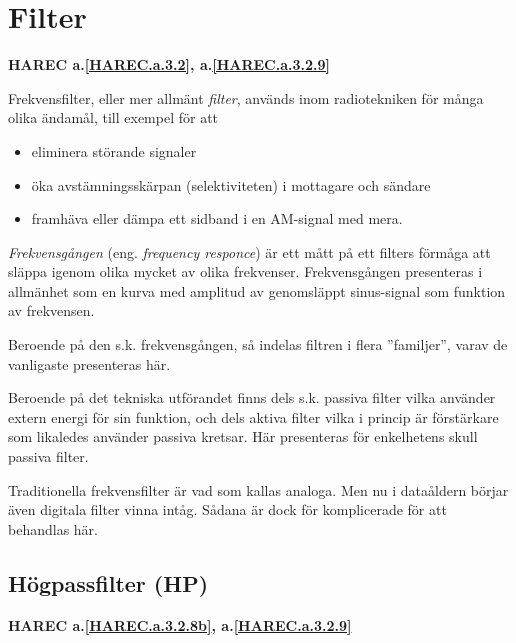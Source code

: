 \section{Filter}
\textbf{HAREC a.\ref{HAREC.a.3.2}\label{myHAREC.a.3.2}, a.\ref{HAREC.a.3.2.9}\label{myHAREC.a.3.2.9}}

Frekvensfilter, eller mer allmänt \emph{filter}, används inom radiotekniken för
många olika ändamål, till exempel för att
\begin{itemize}
  \item eliminera störande signaler
  \item öka avstämningsskärpan (selektiviteten) i mottagare och sändare
  \item framhäva eller dämpa ett sidband i en AM-signal med mera.
\end{itemize}

\emph{Frekvensgången} (eng. \emph{frequency responce}) är ett mått på ett
filters förmåga att släppa igenom olika mycket av olika frekvenser.
Frekvensgången presenteras i allmänhet som en kurva med amplitud av genomsläppt
sinus-signal som funktion av frekvensen.

Beroende på den s.k. frekvensgången, så indelas filtren i flera ''familjer'',
varav de vanligaste presenteras här.

Beroende på det tekniska utförandet finns dels s.k. passiva filter vilka
använder extern energi för sin funktion, och dels aktiva filter vilka i princip
är förstärkare som likaledes använder passiva kretsar.
Här presenteras för enkelhetens skull passiva filter.

Traditionella frekvensfilter är vad som kallas analoga.
Men nu i dataåldern börjar även digitala filter vinna intåg.
Sådana är dock för komplicerade för att behandlas här.

\subsection{Högpassfilter (HP)}
\textbf{HAREC
  a.\ref{HAREC.a.3.2.8b}\label{myHAREC.a.3.2.8b},
  a.\ref{HAREC.a.3.2.9}\label{myHAREC.a.3.2.9a}
}

